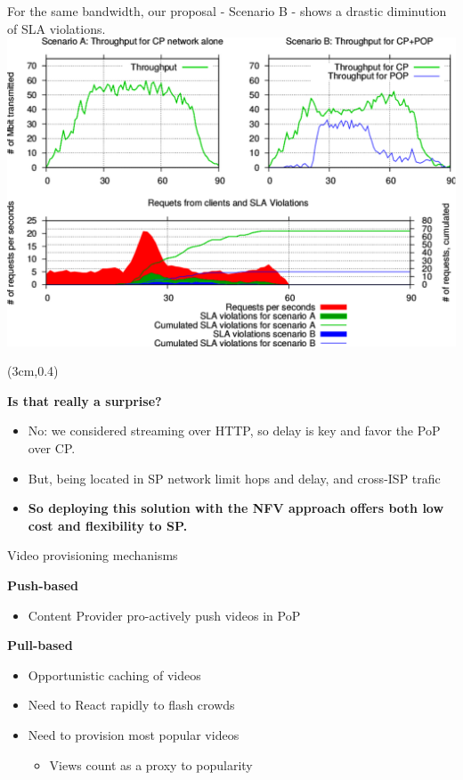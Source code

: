 \documentclass[a4paper]{beamer}
\begin{document}
\begin{frame}{For the same bandwidth, our proposal - Scenario B - shows a drastic diminution of SLA violations.}
	\includegraphics[width=0.90\linewidth]{CP+POP_evaluation.pdf}
		\begin{textblock*}{8cm}(3cm,0.4\textheight)
		\begin{alertblock}{}
			\textbf{ Is that really a surprise? }
			\begin{itemize}
				\item No: we considered streaming over HTTP, so delay is key and favor the PoP over CP.
				\item But, being located in SP network limit hops and delay, and cross-ISP trafic
				\item \textbf{So deploying this solution with the NFV approach offers both low cost and flexibility to SP.}
			\end{itemize}
		\end{alertblock}
	\end{textblock*}		
\end{frame}


\begin{frame}{Video provisioning mechanisms}
	
\textbf{Push-based}	
    
    \begin{itemize}
      \item Content Provider pro-actively push videos in PoP
      
    \end{itemize}

\vspace{2em}
\textbf{Pull-based}
	\begin{itemize}
		 \item Opportunistic caching of videos
		 \item Need to React rapidly to flash crowds
		\item Need to provision most popular videos
	 \begin{itemize}
	  \item Views count as a proxy to popularity
		
		
	 \end{itemize}
	 
	   
	\end{itemize}

    
    
	
\end{frame}
\end{document}
